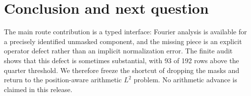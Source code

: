 \documentclass[10pt]{article}
\begin{document}
\section{Conclusion and next question}

The main route contribution is a typed interface: Fourier analysis is
available for a precisely identified unmasked component, and the missing
piece is an explicit operator defect rather than an implicit normalization
error.  The finite audit shows that this defect is sometimes substantial,
with 93 of 192 rows above the quarter threshold.  We therefore freeze the
shortcut of dropping the masks and return to the position-aware arithmetic
$L^2$ problem.  No arithmetic advance is claimed in this release.
\end{document}

